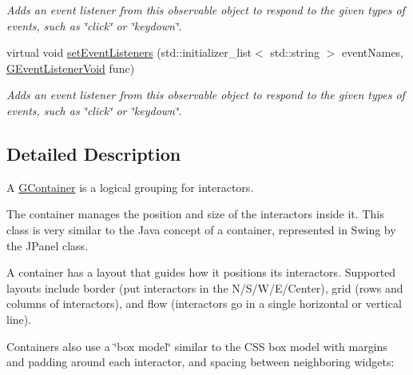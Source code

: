 \begin{DoxyCompactItemize}
\begin{DoxyCompactList}\small\item\em Adds an event listener from this observable object to respond to the given types of events, such as \char`\"{}click\char`\"{} or \char`\"{}keydown\char`\"{}. \end{DoxyCompactList}\item 
virtual void \mbox{\hyperlink{classsgl_1_1GObservable_a7867184bbb686f74fae8a4db927da799}{set\+Event\+Listeners}} (std\+::initializer\+\_\+list$<$ std\+::string $>$ event\+Names, \mbox{\hyperlink{namespacesgl_a54427ce97bb1c2804e4fe2b0a62e8b17}{G\+Event\+Listener\+Void}} func)
\begin{DoxyCompactList}\small\item\em Adds an event listener from this observable object to respond to the given types of events, such as \char`\"{}click\char`\"{} or \char`\"{}keydown\char`\"{}. \end{DoxyCompactList}\end{DoxyCompactItemize}


\subsection{Detailed Description}
A \mbox{\hyperlink{classsgl_1_1GContainer}{G\+Container}} is a logical grouping for interactors. 

The container manages the position and size of the interactors inside it. This class is very similar to the Java concept of a container, represented in Swing by the J\+Panel class.

A container has a layout that guides how it positions its interactors. Supported layouts include border (put interactors in the N/\+S/\+W/\+E/\+Center), grid (rows and columns of interactors), and flow (interactors go in a single horizontal or vertical line).

Containers also use a \char`\"{}box model\char`\"{} similar to the C\+SS box model with margins and padding around each interactor, and spacing between neighboring widgets\+:


